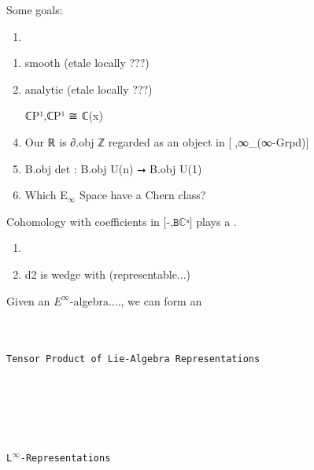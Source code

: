 \documentclass{book}
\theoremstyle{definition}
\renewcommand{\chapter}[1]{
\newpage
{
\Huge 
\begin{center}
\ \\
\ \\
\thispagestyle{empty}
\texttt{#1}
\end{center}}
\ \\
\ \\
}
\begin{document}

Some goals:
\begin{enumerate}
\item 
\end{enumerate}

\begin{enumerate}
\item smooth (etale locally ???)
\item analytic (etale locally ???)
\item [ℂP¹,ℂP¹] ≅ ℂ(x)
\item Our ℝ is ∂.obj ℤ regarded as an object in [γ⃗,∞\_(∞-Grpd)]
\item B.obj det : B.obj U(n) ⭢ B.obj U(1)
\item Which E${}_{\infty}$ Space have a Chern class?
\end{enumerate}

Cohomology with coefficients in $\texttt{[-,Bℂˣ]}$ plays a .\\

\begin{enumerate}
\item 
\item d2 is wedge with (representable...)
\end{enumerate}

Given an $E^{\infty}$-algebra...., we can form an \\



\newpage
\chapter{Tensor Product of Lie-Algebra Representations}




\newpage
\chapter{L${}^{\infty}$-Representations}
\end{document}
